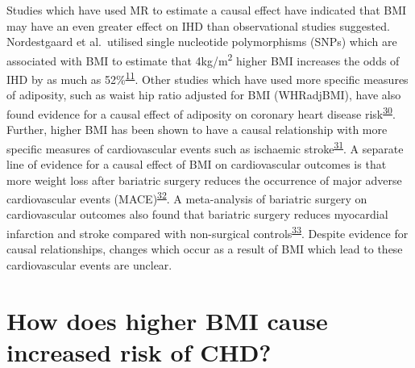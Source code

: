 \documentclass[11pt,twoside]{bristolthesis}
\begin{document}
Studies which have used MR to estimate a causal effect have indicated that BMI may have an even greater effect on IHD than observational studies suggested. Nordestgaard et al.~utilised single nucleotide polymorphisms (SNPs) which are associated with BMI to estimate that 4kg/m\textsuperscript{2} higher BMI increases the odds of IHD by as much as 52\%\textsuperscript{\protect\hyperlink{ref-Nordestgaard2012}{11}}. Other studies which have used more specific measures of adiposity, such as waist hip ratio adjusted for BMI (WHRadjBMI), have also found evidence for a causal effect of adiposity on coronary heart disease risk\textsuperscript{\protect\hyperlink{ref-Dale2017}{30}}. Further, higher BMI has been shown to have a causal relationship with more specific measures of cardiovascular events such as ischaemic stroke\textsuperscript{\protect\hyperlink{ref-Harshfield2021}{31}}. A separate line of evidence for a causal effect of BMI on cardiovascular outcomes is that more weight loss after bariatric surgery reduces the occurrence of major adverse cardiovascular events (MACE)\textsuperscript{\protect\hyperlink{ref-Jimenez2021}{32}}. A meta-analysis of bariatric surgery on cardiovascular outcomes also found that bariatric surgery reduces myocardial infarction and stroke compared with non-surgical controls\textsuperscript{\protect\hyperlink{ref-vanVeldhuisen2022}{33}}. Despite evidence for causal relationships, changes which occur as a result of BMI which lead to these cardiovascular events are unclear.

\hypertarget{how-does-higher-bmi-cause-increased-risk-of-chd}{%
\section{How does higher BMI cause increased risk of CHD?}\label{how-does-higher-bmi-cause-increased-risk-of-chd}}
\end{document}

